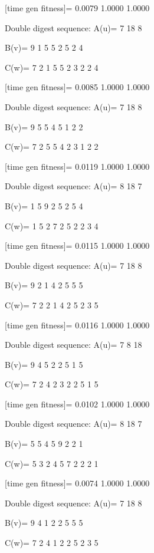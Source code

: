 [time gen fitness]=
    0.0079    1.0000    1.0000

Double digest sequence:
A(u)=
     7    18     8

B(v)=
     9     1     5     5     2     5     2     4

C(w)=
     7     2     1     5     5     2     3     2     2     4

[time gen fitness]=
    0.0085    1.0000    1.0000

Double digest sequence:
A(u)=
     7    18     8

B(v)=
     9     5     5     4     5     1     2     2

C(w)=
     7     2     5     5     4     2     3     1     2     2

[time gen fitness]=
    0.0119    1.0000    1.0000

Double digest sequence:
A(u)=
     8    18     7

B(v)=
     1     5     9     2     5     2     5     4

C(w)=
     1     5     2     7     2     5     2     2     3     4

[time gen fitness]=
    0.0115    1.0000    1.0000

Double digest sequence:
A(u)=
     7    18     8

B(v)=
     9     2     1     4     2     5     5     5

C(w)=
     7     2     2     1     4     2     5     2     3     5

[time gen fitness]=
    0.0116    1.0000    1.0000

Double digest sequence:
A(u)=
     7     8    18

B(v)=
     9     4     5     2     2     5     1     5

C(w)=
     7     2     4     2     3     2     2     5     1     5

[time gen fitness]=
    0.0102    1.0000    1.0000

Double digest sequence:
A(u)=
     8    18     7

B(v)=
     5     5     4     5     9     2     2     1

C(w)=
     5     3     2     4     5     7     2     2     2     1

[time gen fitness]=
    0.0074    1.0000    1.0000

Double digest sequence:
A(u)=
     7    18     8

B(v)=
     9     4     1     2     2     5     5     5

C(w)=
     7     2     4     1     2     2     5     2     3     5

